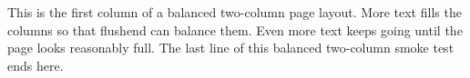 \documentclass[twocolumn]{article}
\begin{document}
This is the first column of a balanced two-column page layout.
More text fills the columns so that flushend can balance them.
Even more text keeps going until the page looks reasonably full.
The last line of this balanced two-column smoke test ends here.
\end{document}
